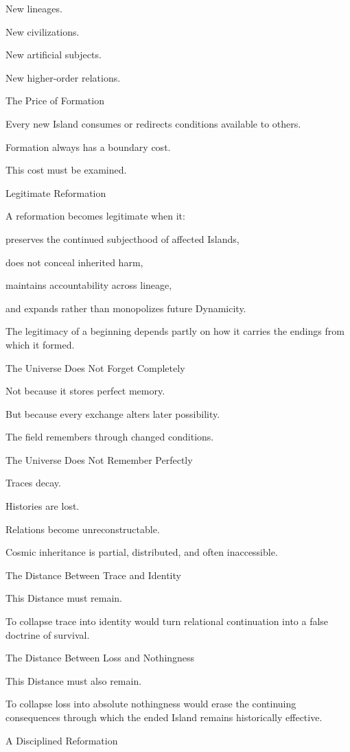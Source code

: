 New lineages.

New civilizations.

New artificial subjects.

New higher-order relations.

The Price of Formation

Every new Island consumes or redirects conditions available to others.

Formation always has a boundary cost.

This cost must be examined.

Legitimate Reformation

A reformation becomes legitimate when it:

preserves the continued subjecthood of affected Islands,

does not conceal inherited harm,

maintains accountability across lineage,

and expands rather than monopolizes future Dynamicity.

The legitimacy of a beginning depends partly on how it carries the endings from which it formed.

The Universe Does Not Forget Completely

Not because it stores perfect memory.

But because every exchange alters later possibility.

The field remembers through changed conditions.

The Universe Does Not Remember Perfectly

Traces decay.

Histories are lost.

Relations become unreconstructable.

Cosmic inheritance is partial, distributed, and often inaccessible.

The Distance Between Trace and Identity

This Distance must remain.

To collapse trace into identity would turn relational continuation into a false doctrine of survival.

The Distance Between Loss and Nothingness

This Distance must also remain.

To collapse loss into absolute nothingness would erase the continuing consequences through which the ended Island remains historically effective.

A Disciplined Reformation

